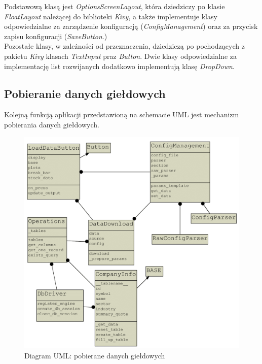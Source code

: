 Podstawową klasą jest \textit{OptionsScreenLayout}, która dziedziczy po klasie \textit{FloatLayout} należącej do biblioteki \textit{Kivy}, 
a także implementuje klasy odpowiedzialne za zarządzenie konfiguracją (\textit{ConfigManagement}) oraz za przycisk zapisu konfiguracji (\textit{SaveButton}.)\\

Pozostałe klasy, w zależności od przeznaczenia, dziedziczą po pochodzących z pakietu \textit{Kivy} klasach \textit{TextInput} praz \textit{Button}.
Dwie klasy odpowiedzialne za implementację list rozwijanych dodatkowo implementują klasę \textit{DropDown}.\\

\subsection{Pobieranie danych giełdowych}
Kolejną funkcją aplikacji przedstawioną na schemacie UML jest mechanizm pobierania danych giełdowych.\\
\begin{figure}[h!]
\centering
\includegraphics[width=150mm,heigh=100mm]{pictures/uml_load_data.png}
\caption{Diagram UML: pobierane danych giełdowych}
\label{fig:Diagram UML: pobieranie danych giełdowych}
\end{figure}

